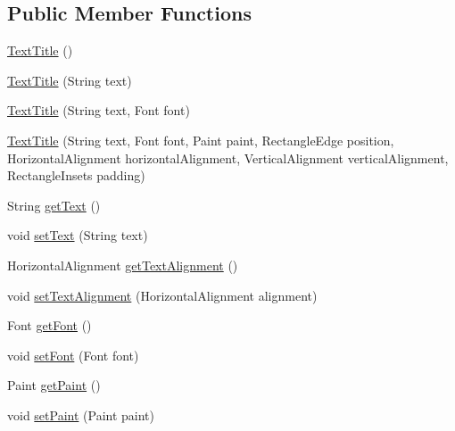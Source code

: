 \subsection*{Public Member Functions}
\begin{DoxyCompactItemize}
\item 
\mbox{\hyperlink{classorg_1_1jfree_1_1chart_1_1title_1_1_text_title_a32ddfdbb367775e317b8117973a536a5}{Text\+Title}} ()
\item 
\mbox{\hyperlink{classorg_1_1jfree_1_1chart_1_1title_1_1_text_title_a0fe6ba5d189d65ee7925eb12f5ec9746}{Text\+Title}} (String text)
\item 
\mbox{\hyperlink{classorg_1_1jfree_1_1chart_1_1title_1_1_text_title_ae7dae37733ae0bea8e204a438ce21413}{Text\+Title}} (String text, Font font)
\item 
\mbox{\hyperlink{classorg_1_1jfree_1_1chart_1_1title_1_1_text_title_a38bf34a1180edd5cdfaca7fc00568828}{Text\+Title}} (String text, Font font, Paint paint, Rectangle\+Edge position, Horizontal\+Alignment horizontal\+Alignment, Vertical\+Alignment vertical\+Alignment, Rectangle\+Insets padding)
\item 
String \mbox{\hyperlink{classorg_1_1jfree_1_1chart_1_1title_1_1_text_title_abef1d4aca056ced7cb1af6da5ea2f322}{get\+Text}} ()
\item 
void \mbox{\hyperlink{classorg_1_1jfree_1_1chart_1_1title_1_1_text_title_a785cbdf64eec81ca253a3767c415547c}{set\+Text}} (String text)
\item 
Horizontal\+Alignment \mbox{\hyperlink{classorg_1_1jfree_1_1chart_1_1title_1_1_text_title_a4389bb8e5461cc851031419eef9a8323}{get\+Text\+Alignment}} ()
\item 
void \mbox{\hyperlink{classorg_1_1jfree_1_1chart_1_1title_1_1_text_title_aa0cf2a633b5739b99364223454b1c705}{set\+Text\+Alignment}} (Horizontal\+Alignment alignment)
\item 
Font \mbox{\hyperlink{classorg_1_1jfree_1_1chart_1_1title_1_1_text_title_aee9adcb15d6cadf5ec0282cdf5225f53}{get\+Font}} ()
\item 
void \mbox{\hyperlink{classorg_1_1jfree_1_1chart_1_1title_1_1_text_title_a7f3d4b6549f6779a418e98e1e50aea62}{set\+Font}} (Font font)
\item 
Paint \mbox{\hyperlink{classorg_1_1jfree_1_1chart_1_1title_1_1_text_title_a28e3edf87989ddb4c93854709c044aa0}{get\+Paint}} ()
\item 
void \mbox{\hyperlink{classorg_1_1jfree_1_1chart_1_1title_1_1_text_title_aabe0fdb633a983b1236433c4fd60dd3f}{set\+Paint}} (Paint paint)

\end{DoxyCompactItemize}
